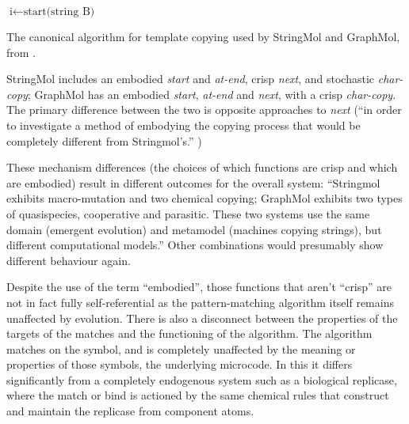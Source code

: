 \begin{algorithm}[ht]
	$\text{i} \leftarrow \text{start(string B)}$\;
	\caption[The canonical algorithm for template copying used by StringMol and GraphMol]{The canonical algorithm for template copying used by StringMol and GraphMol, from \textcite{Nellis2014}.}
	\label{alg:stringmolgraphmol}
\end{algorithm}

StringMol includes an embodied \emph{start} and \emph{at-end}, crisp \emph{next}, and stochastic \emph{char-copy}; GraphMol has an embodied \emph{start}, \emph{at-end} and \emph{next}, with a crisp \emph{char-copy}. The primary difference between the two is opposite approaches to \emph{next} (``in order to investigate a method of embodying the copying process that would be completely different from Stringmol's.'' \parencite[p.145]{Nellis2012})

These mechanism differences (the choices of which functions are crisp and which are embodied) result in different outcomes for the overall system: ``Stringmol exhibits macro-mutation and two chemical copying; GraphMol exhibits two types of quasispecies, cooperative and parasitic. These two systems use the same domain (emergent evolution) and metamodel (machines copying strings), but different computational models.'' Other combinations would presumably show different behaviour again.

Despite the use of the term ``embodied'', those functions that aren't ``crisp'' are not in fact fully self-referential as the pattern-matching algorithm itself remains unaffected by evolution. There is also a disconnect between the properties of the targets of the matches and the functioning of the algorithm. The algorithm matches on the symbol, and is completely unaffected by the meaning or properties of those symbols, the underlying microcode. In this it differs significantly from a completely endogenous system such as a biological replicase, where the match or bind is actioned by the same chemical rules that construct and maintain the replicase from component atoms.

